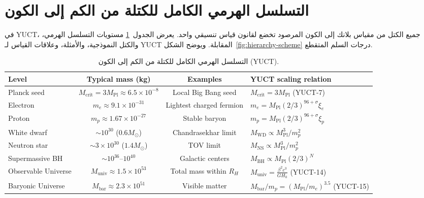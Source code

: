 \documentclass[12pt,a4paper]{article}
\newcommand{\betaf}{\beta}
\begin{document}
	\section{التسلسل الهرمي الكامل للكتلة من الكم إلى الكون}
	
	في YUCT، جميع الكتل من مقياس بلانك إلى الكون المرصود تخضع لقانون قياس تنسيقي واحد. يعرض الجدول~\ref{tab:full-hierarchy} مستويات التسلسل الهرمي، والكتل النموذجية، والأمثلة، وعلاقات القياس لـ YUCT المقابلة. ويوضح الشكل~\ref{fig:hierarchy-scheme} درجات السلم المتقطع.
	
	\begin{otherlanguage}{english}
		\begin{table}[htbp]
			\centering
			\caption{التسلسل الهرمي الكامل للكتلة من الكم إلى الكون (YUCT).}
			\label{tab:full-hierarchy}
			\small
			\begin{tabular}{l c c l}
				\toprule
				\textbf{Level} & \textbf{Typical mass (kg)} & \textbf{Examples} & \textbf{YUCT scaling relation} \\
				\midrule
				Planck seed & \(M_{\mathrm{crit}} = 3M_{\mathrm{Pl}} \approx 6.5\times10^{-8}\) & Local Big Bang seed & \(M_{\mathrm{crit}} = 3 M_{\mathrm{Pl}}\) (YUCT-7) \\
				Electron & \(m_e \approx 9.1\times10^{-31}\) & Lightest charged fermion & \(m_e = M_{\mathrm{Pl}} (2/3)^{96+\sigma}\xi_e\) \\
				Proton & \(m_p \approx 1.67\times10^{-27}\) & Stable baryon & \(m_p = M_{\mathrm{Pl}} (2/3)^{96+\sigma}\xi_p\) \\
				White dwarf & \(\sim 10^{30}\) (\(0.6M_\odot\)) & Chandrasekhar limit & \(M_{\mathrm{WD}} \propto M_{\mathrm{Pl}}^{3}/m_p^2\) \\
				Neutron star & \(\sim 3\times10^{30}\) (\(1.4M_\odot\)) & TOV limit & \(M_{\mathrm{NS}} \propto M_{\mathrm{Pl}}^{3}/m_p^2\) \\
				Supermassive BH & \(\sim 10^{36}\)–\(10^{40}\) & Galactic centers & \(M_{\mathrm{BH}} \propto M_{\mathrm{Pl}} (2/3)^{N}\) \\
				Observable Universe & \(M_{\mathrm{univ}} \approx 1.5\times10^{53}\) & Total mass within \(R_H\) & \(M_{\mathrm{univ}} = \frac{\betaf^2 c^3}{G H_0}\) (YUCT-14) \\
				Baryonic Universe & \(M_{\mathrm{bar}} \approx 2.3\times10^{51}\) & Visible matter & \(M_{\mathrm{bar}}/m_p = (M_{\mathrm{Pl}}/m_e)^{3.5}\) (YUCT-15) \\
				\bottomrule
			\end{tabular}
		\end{table}
	\end{otherlanguage}
	
\end{document}
